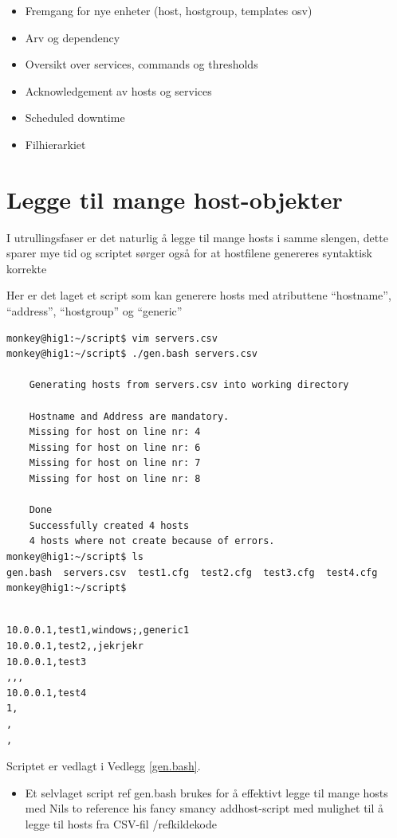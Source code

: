 \begin{itemize}
	\item Fremgang for nye enheter (host, hostgroup, templates osv)
        \item Arv og dependency
        \item Oversikt over services, commands og thresholds
        \item Acknowledgement av hosts og services
        \item Scheduled downtime
        \item Filhierarkiet
\end{itemize}
\section{Legge til mange host-objekter}
I utrullingsfaser er det naturlig å legge til mange hosts i samme slengen, dette sparer mye tid og scriptet sørger også for at hostfilene genereres syntaktisk korrekte

Her er det laget et script som kan generere hosts med atributtene  ``hostname'', ``address'', ``hostgroup'' og ``generic''

\begin{lstlisting}
monkey@hig1:~/script$ vim servers.csv
monkey@hig1:~/script$ ./gen.bash servers.csv

	Generating hosts from servers.csv into working directory

	Hostname and Address are mandatory.
	Missing for host on line nr: 4
	Missing for host on line nr: 6
	Missing for host on line nr: 7
	Missing for host on line nr: 8

	Done
	Successfully created 4 hosts
	4 hosts where not create because of errors.
monkey@hig1:~/script$ ls
gen.bash  servers.csv  test1.cfg  test2.cfg  test3.cfg  test4.cfg
monkey@hig1:~/script$
\end{lstlisting}

\begin{lstlisting}

10.0.0.1,test1,windows;,generic1
10.0.0.1,test2,,jekrjekr
10.0.0.1,test3
,,,
10.0.0.1,test4
1,
,
,
\end{lstlisting}

Scriptet er vedlagt i Vedlegg \ref{gen.bash}.


\begin{itemize}
	\item Et selvlaget script ref gen.bash brukes for å effektivt legge til mange hosts med Nils to reference his fancy smancy addhost-script med mulighet til å legge til hosts fra CSV-fil /ref{kildekode}
\end{itemize}
